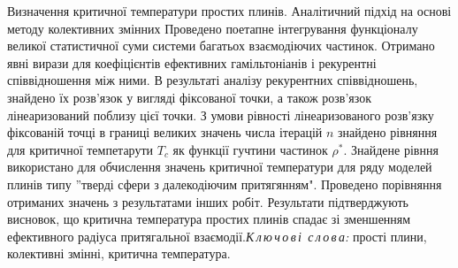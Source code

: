 \documentclass[fleqn,twoside,twocolumn,nofootinbib,showkeys]{revtex4} %
\begin{document}




\vskip3mm \textit{}

%


\vspace*{-5mm}  {Визначення критичної температури простих плинів. Аналітичний підхід на основі методу колективних змінних} {Проведено поетапне інтегрування функціоналу великої статистичної суми системи багатьох взаємодіючих частинок. Отримано явні вирази для коефіцієнтів ефективних гамільтоніанів і рекурентні співвідношення між ними. В результаті аналізу рекурентних співвідношень, знайдено їх розв'язок у вигляді фіксованої точки, а також розв'язок лінеаризований поблизу цієї точки. З умови рівності лінеаризованого розв'язку фіксованій точці в границі великих значень числа ітерацій $n$ знайдено рівняння для критичної темпетарути $T_c$ як функції гучтини частинок $\rho^*$. Знайдене рівння використано для обчислення значень критичної температури для ряду моделей плинів типу ''тверді сфери з далекодіючим притягянням". Проведено порівняння отриманих значень з результатами інших робіт. Результати підтверджують висновок, що критична температура простих плинів спадає зі зменшенням ефективного радіуса притягальної взаємодії.}{\textit{К\,л\,ю\,ч\,о\,в\,і\,
с\,л\,о\,в\,а:} прості плини, колективні змінні, критична температура.}
\end{document}
